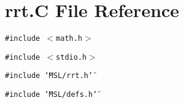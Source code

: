 \section{rrt.C File Reference}
\label{rrt_8C}
{\tt \#include $<$math.h$>$}\par
{\tt \#include $<$stdio.h$>$}\par
{\tt \#include \char`\"{}MSL/rrt.h\char`\"{}}\par
{\tt \#include \char`\"{}MSL/defs.h\char`\"{}}\par
